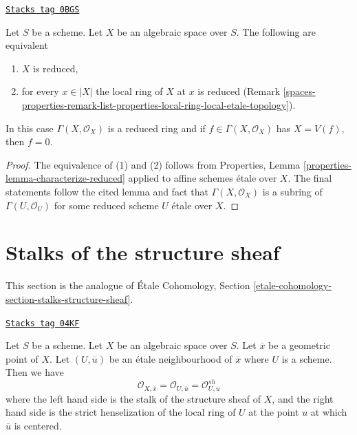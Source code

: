 \begin{lemma}
\label{spaces-properties-lemma-reduced-space}
\href{https://stacks.math.columbia.edu/tag/0BGS}{\texttt{Stacks tag 0BGS}}

Let $S$ be a scheme. Let $X$ be an algebraic space over $S$.
The following are equivalent
\begin{enumerate}
\item $X$ is reduced,
\item for every $x \in |X|$ the local ring of $X$ at $x$ is
reduced (Remark \ref{spaces-properties-remark-list-properties-local-ring-local-etale-topology}).
\end{enumerate}
In this case $\Gamma(X, \mathcal{O}_X)$ is a reduced ring and
if $f \in \Gamma(X, \mathcal{O}_X)$ has $X = V(f)$, then $f = 0$.
\end{lemma}

\begin{proof}
The equivalence of (1) and (2) follows from
Properties, Lemma \ref{properties-lemma-characterize-reduced}
applied to affine schemes \'etale over $X$. The final statements
follow the cited lemma and fact that $\Gamma(X, \mathcal{O}_X)$ is
a subring of $\Gamma(U, \mathcal{O}_U)$ for some
reduced scheme $U$ \'etale over $X$.
\end{proof}

\section{Stalks of the structure sheaf}
\label{spaces-properties-section-stalks-structure-sheaf}
This section is the analogue of
\'Etale Cohomology, Section
\ref{etale-cohomology-section-stalks-structure-sheaf}.

\begin{lemma}
\label{spaces-properties-lemma-describe-etale-local-ring}
\href{https://stacks.math.columbia.edu/tag/04KF}{\texttt{Stacks tag 04KF}}

Let $S$ be a scheme.
Let $X$ be an algebraic space over $S$.
Let $\overline{x}$ be a geometric point of $X$.
Let $(U, \overline{u})$ be an \'etale neighbourhood of $\overline{x}$
where $U$ is a scheme. Then we have
$$
\mathcal{O}_{X, \overline{x}} =
\mathcal{O}_{U, \overline{u}} =
\mathcal{O}_{U, u}^{sh}
$$
where the left hand side is the stalk of the structure sheaf of $X$,
and the right hand side is the strict henselization of the local ring
of $U$ at the point $u$ at which $\overline{u}$ is centered.
\end{lemma}

